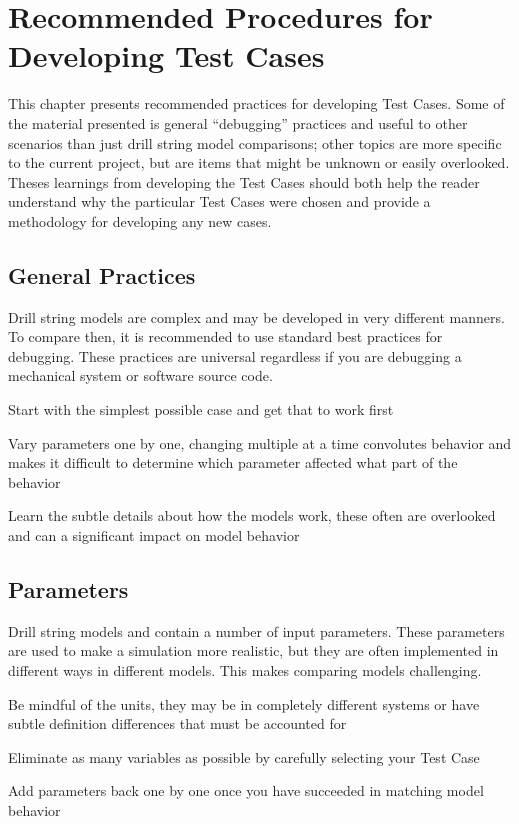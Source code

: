 \chapter{Recommended Procedures for Developing Test Cases}
This chapter presents recommended practices for developing Test Cases.  Some of the material presented is general ``debugging'' practices and useful to other scenarios than just drill string model comparisons; other topics are more specific to the current project, but are items that might be unknown or easily overlooked.  Theses learnings from developing the Test Cases should both help the reader understand why the particular Test Cases were chosen and provide a methodology for developing any new cases.

\section{General Practices}
Drill string models are complex and may be developed in very different manners.  To compare then, it is recommended to use standard best practices for debugging.  These practices are universal regardless if you are debugging a mechanical system or software source code.
\begin{bulletedlist}
	\item Start with the simplest possible case and get that to work first
	\item Vary parameters one by one, changing multiple at a time convolutes behavior and makes it difficult to determine which parameter affected what part of the behavior
    \item Learn the subtle details about how the models work, these often are overlooked and can a significant impact on model behavior
\end{bulletedlist}

\section{Parameters}
Drill string models and contain a number of input parameters.  These parameters are used to make a simulation more realistic, but they are often implemented in different ways in different models.  This makes comparing models challenging.
\begin{numberedlist}
	\item Be mindful of the units, they may be in completely different systems or have subtle definition differences that must be accounted for
	\item Eliminate as many variables as possible by carefully selecting your Test Case
	\item Add parameters back one by one once you have succeeded in matching model behavior
\end{numberedlist}

